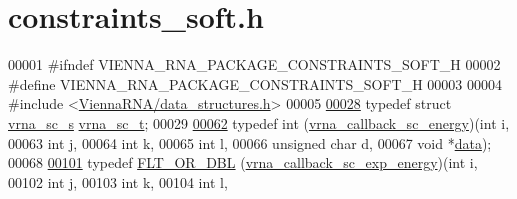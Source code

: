 \hypertarget{constraints__soft_8h_source}{}\section{constraints\+\_\+soft.\+h}
\label{constraints__soft_8h_source}

\begin{DoxyCode}
00001 \textcolor{preprocessor}{#ifndef VIENNA\_RNA\_PACKAGE\_CONSTRAINTS\_SOFT\_H}
00002 \textcolor{preprocessor}{#define VIENNA\_RNA\_PACKAGE\_CONSTRAINTS\_SOFT\_H}
00003 
00004 \textcolor{preprocessor}{#include <\hyperlink{data__structures_8h}{ViennaRNA/data\_structures.h}>}
00005 
\hyperlink{group__soft__constraints_ga75401ce219ef8dbcceb672db82d434c6}{00028} \textcolor{keyword}{typedef} \textcolor{keyword}{struct  }\hyperlink{group__soft__constraints_structvrna__sc__s}{vrna\_sc\_s} \hyperlink{group__soft__constraints_structvrna__sc__s}{vrna\_sc\_t};
00029 
\hyperlink{group__soft__constraints_ga88a266695d9e25cc12114dceb7b4565e}{00062} \textcolor{keyword}{typedef} int (\hyperlink{group__soft__constraints_ga88a266695d9e25cc12114dceb7b4565e}{vrna\_callback\_sc\_energy})(\textcolor{keywordtype}{int}           i,
00063                                       \textcolor{keywordtype}{int}           j,
00064                                       \textcolor{keywordtype}{int}           k,
00065                                       \textcolor{keywordtype}{int}           l,
00066                                       \textcolor{keywordtype}{unsigned} \textcolor{keywordtype}{char} d,
00067                                       \textcolor{keywordtype}{void}          *\hyperlink{group__soft__constraints_a7574680143df97b9029146c2150bf06d}{data});
00068 
\hyperlink{group__soft__constraints_ga4099978d410513edeeff8f3db13144c5}{00101} \textcolor{keyword}{typedef} \hyperlink{group__data__structures_ga31125aeace516926bf7f251f759b6126}{FLT\_OR\_DBL} (\hyperlink{group__soft__constraints_ga4099978d410513edeeff8f3db13144c5}{vrna\_callback\_sc\_exp\_energy})(\textcolor{keywordtype}{int}            i,
00102                                                  \textcolor{keywordtype}{int}            j,
00103                                                  \textcolor{keywordtype}{int}            k,
00104                                                  \textcolor{keywordtype}{int}            l,

\end{DoxyCode}
